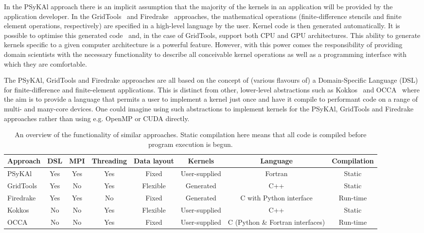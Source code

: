 \documentclass[gmdd, manuscript]{copernicus}
\begin{document}
In the {PS}y{KA}l approach there is an implicit assumption that the
majority of the kernels in an application will be provided by the
application developer. In the GridTools~\citep{grid_tools} and
Firedrake~\citep{firedrake,fenics} approaches, the mathematical
operations (finite-difference stencils and finite element operations,
respectively) are specified in a high-level language by the
user. Kernel code is then generated automatically. It is possible to
optimise this generated code~\citep{coffee} and, in the case of
GridTools, support both CPU and GPU architectures. This ability to
generate kernels specific to a given computer architecture is a
powerful feature. However, with this power comes the responsibility of
providing domain scientists with the necessary functionality to
describe all conceivable kernel operations as well as a programming
interface with which they are comfortable.

The {PS}y{KA}l, GridTools and Firedrake approaches are all based on
the concept of (various flavours of) a Domain-Specific Language (DSL)
for finite-difference and finite-element applications. This is
distinct from other, lower-level abstractions such as
Kokkos~\citep{kokkos} and OCCA~\citep{occa} where the aim is to
provide a language that permits a user to implement a kernel just once
and have it compile to performant code on a range of multi- and
many-core devices. One could imagine using such abstractions to
implement kernels for the {PS}y{KA}l, GridTools and Firedrake
approaches rather than using e.g. OpenMP or CUDA directly.


\begin{table}
\caption{An overview of the functionality of similar approaches. Static compilation here means that all code is compiled before program execution is begun.}
\label{TABLE_dsl_compare}
\centering
\begin{tabular}{l|c|c|c|c|c|c|c}
\hline
Approach   & DSL & MPI & Threading & Data layout & Kernels & Language & Compilation  \\
\hline
{PS}y{KA}l & Yes & Yes & Yes & Fixed  & User-supplied & Fortran & Static \\
GridTools  & Yes & No  & Yes & Flexible & Generated & C++  & Static \\
Firedrake  & Yes & Yes & No  & Fixed  & Generated & C with Python interface & Run-time \\
Kokkos     & No  & No  & Yes & Flexible & User-supplied & C++ & Static \\
OCCA       & No  & No  & Yes & Fixed  & User-supplied & C (Python \& Fortran interfaces) & Run-time \\
\hline
\end{tabular}
\end{table}
\end{document}
